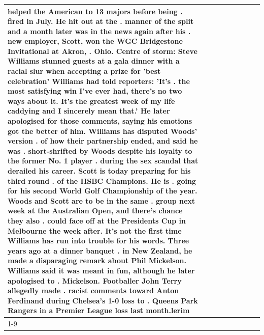 \begin{table}[H]
\begin{tabular}{lllrlllll}
helped the American to 13 majors before being . fired in July. He hit out at the . manner of the split and a month later was in the news again after his . new employer, Scott, won the WGC Bridgestone Invitational at Akron, . Ohio. Centre of storm: Steve Williams stunned guests at a gala dinner with a racial slur when accepting a prize for 'best celebration' Williams had told reporters: 'It's . the most satisfying win I've ever had, there's no two ways about it. It's the greatest week of my life caddying and I sincerely mean that.' He later apologised for those comments, saying his emotions got the better of him. Williams has disputed Woods' version . of how their partnership ended, and said he was . short-shrifted by Woods despite his loyalty to the former No. 1 player . during the sex scandal that derailed his career. Scott is today preparing for his third round . of the HSBC Champions. He is . going for his second World Golf Championship of the year. Woods and Scott are to be in the same . group next week at the Australian Open, and there's chance they also . could face off at the Presidents Cup in Melbourne the week after. It's not the first time Williams has run into trouble for his words. Three years ago at a dinner banquet . in New Zealand, he made a disparaging remark about Phil Mickelson. Williams said it was meant in fun, although he later apologised to . Mickelson. Footballer John Terry allegedly made . racist comments toward Anton Ferdinand during Chelsea's 1-0 loss to . Queens Park Rangers in a Premier League loss last month.lerim \\
\cline{1-9}

\end{tabular}
\end{table}
